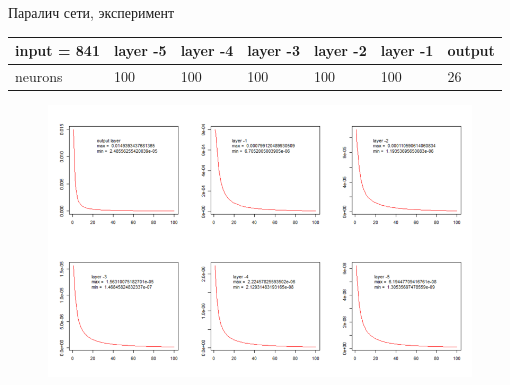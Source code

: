 \documentclass[10pt]{beamer}
\begin{document}
\begin{frame}{Паралич сети, эксперимент}

\begin{table}[h]
\begin{tabular}{|l|l|l|l|l|l|l|}
\hline
input = 841 & layer -5 & layer -4 & layer -3 & layer -2 & layer -1 & output \\ \hline
neurons     & 100      & 100      & 100      & 100      & 100      & 26     \\ \hline
\end{tabular}
\end{table}

\begin{figure}[h!]
  \centering
  \includegraphics[width=1\textwidth]{images/bp_hist.png}
\end{figure}


\end{frame}
\end{document}
